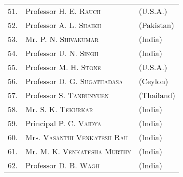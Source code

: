\begin{longtable}{r@{\;\,}ll}
51. & Professor \textsc{H. E. Rauch} & (U.S.A.)\\
52. & Professor \textsc{A. L. Shaikh} & (Pakistan)\\
53. & Mr. \textsc{P. N. Shivakumar} & (India)\\
54. & Professor \textsc{U. N. Singh} & (India)\\
55. & Professor \textsc{M. H. Stone} & (U.S.A.)\\
56. & Professor \textsc{D. G. Sugathadasa} & (Ceylon)\\
57. & Professor \textsc{S. Tanbunyuen} & (Thailand)\\
58. & Mr. \textsc{S. K. Tekurkar} & (India)\\
59. & Principal \textsc{P. C. Vaidya} & (India)\\
60. & Mrs. \textsc{Vasanthi Venkatesh Rau} & (India)\\
61. & Mr. \textsc{M. K. Venkatesha Murthy} & (India)\\
62. & Professor \textsc{D. B. Wagh} & (India)\\
\end{longtable}

